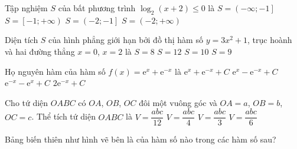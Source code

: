 \begin{ex}%
	Tập nghiệm $S$ của bất phương trình $\log_2{(x+2)} \leq 0$ là
	\choice
	{$S=\left(-\infty;-1\right]$}
	{$S=\left[-1;+\infty\right)$}
	{\True $S=\left(-2;-1\right]$}
	{$S=\left(-2;+\infty \right)$}
\end{ex}

\begin{ex}%
	Diện tích $S$ của hình phẳng giới hạn bởi đồ thị hàm số $y=3x^2+1$, trục hoành và hai đường thẳng $x=0$, $x=2$ là
	\choice
	{$S=8$}
	{$S=12$}
	{\True $S=10$}
	{$S=9$}
\end{ex}

\begin{ex}%
	Họ nguyên hàm của hàm số $f(x)=\mathrm{e}^{x}+\mathrm{e}^{-x}$ là
	\choice
	{$\mathrm{e}^{x}+\mathrm{e}^{-x}+C$}
	{\True $\mathrm{e}^{x}-\mathrm{e}^{-x}+C$}
	{$\mathrm{e}^{-x}-\mathrm{e}^{x}+C$}
	{$2\mathrm{e}^{-x}+C$}
\end{ex}

\begin{ex}%
	Cho tứ diện $OABC$ có $OA$, $OB$, $OC$ đôi một vuông góc và $OA=a$, $OB=b$, $OC=c$. Thể tích tứ diện $OABC$ là
	\choice
	{$V=\dfrac{abc}{12}$}
	{$V=\dfrac{abc}{4}$}
	{$V=\dfrac{abc}{3}$}
	{\True $V=\dfrac{abc}{6}$}
\end{ex}

\begin{ex}%
	Bảng biến thiên như hình vẽ bên là của hàm số nào trong các hàm số sau? 
\end{ex}

